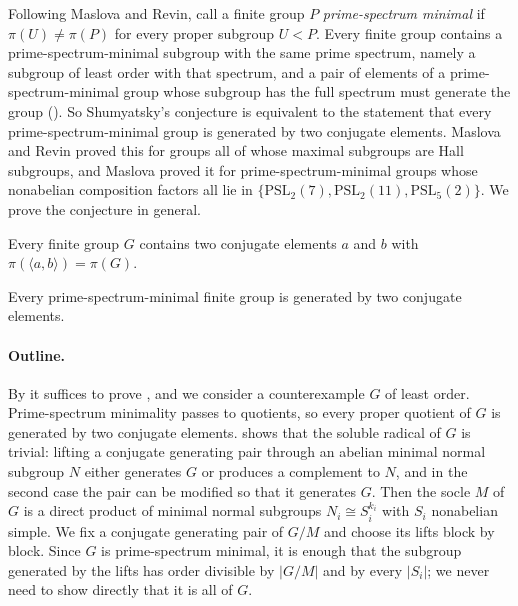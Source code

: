 \documentclass[11pt,colorlinks]{charlie}
\newcommand{\gen}[1]{\langle #1\rangle}
\begin{document}
Following Maslova and Revin, call a finite group $P$ \emph{prime-spectrum minimal} if $\pi(U)\ne\pi(P)$ for every proper subgroup $U<P$. Every finite group contains a prime-spectrum-minimal subgroup with the same prime spectrum, namely a subgroup of least order with that spectrum, and a pair of elements of a prime-spectrum-minimal group whose subgroup has the full spectrum must generate the group (). So Shumyatsky's conjecture is equivalent to the statement that every prime-spectrum-minimal group is generated by two conjugate elements. Maslova and Revin \cite{MR13} proved this for groups all of whose maximal subgroups are Hall subgroups, and Maslova \cite{Maslova} proved it for prime-spectrum-minimal groups whose nonabelian composition factors all lie in $\{\mathrm{PSL}_2(7),\mathrm{PSL}_2(11),\mathrm{PSL}_5(2)\}$. We prove the conjecture in general.

\begin{theorem}\label{thm:main}
Every finite group $G$ contains two conjugate elements $a$ and $b$ with $\pi(\gen{a,b})=\pi(G)$.
\end{theorem}

\begin{corollary}\label{cor:psm}
Every prime-spectrum-minimal finite group is generated by two conjugate elements.
\end{corollary}

\paragraph{Outline.}
By  it suffices to prove , and we consider a counterexample $G$ of least order. Prime-spectrum minimality passes to quotients, so every proper quotient of $G$ is generated by two conjugate elements.  shows that the soluble radical of $G$ is trivial: lifting a conjugate generating pair through an abelian minimal normal subgroup $N$ either generates $G$ or produces a complement to $N$, and in the second case the pair can be modified so that it generates $G$. Then the socle $M$ of $G$ is a direct product of minimal normal subgroups $N_i\cong S_i^{k_i}$ with $S_i$ nonabelian simple. We fix a conjugate generating pair of $G/M$ and choose its lifts block by block. Since $G$ is prime-spectrum minimal, it is enough that the subgroup generated by the lifts has order divisible by $|G/M|$ and by every $|S_i|$; we never need to show directly that it is all of $G$.
\end{document}
